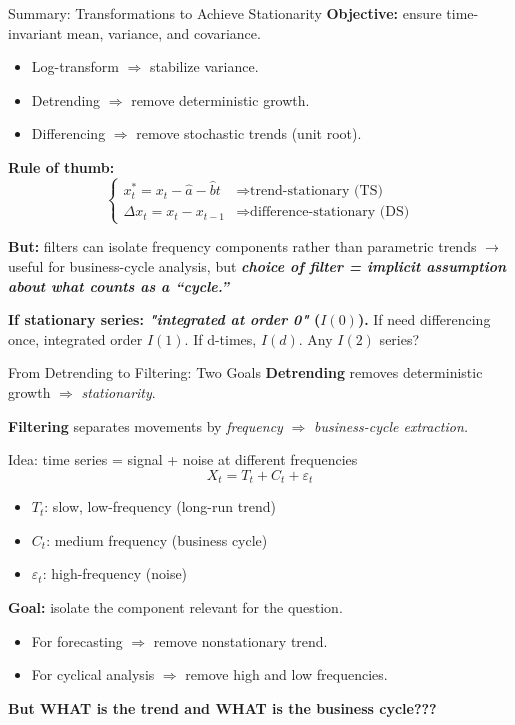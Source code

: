\documentclass{beamer}
\begin{document}
\begin{frame}{Summary: Transformations to Achieve Stationarity}
\small
\textbf{Objective:} ensure time-invariant mean, variance, and covariance.

\begin{itemize}
  \item Log-transform $\Rightarrow$ stabilize variance.
  \item Detrending $\Rightarrow$ remove deterministic growth.
  \item Differencing $\Rightarrow$ remove stochastic trends (unit root).
\end{itemize}

\pause
\textbf{Rule of thumb:}
\[
\begin{cases}
x_t^* = x_t - \hat a - \hat b t & \Rightarrow \text{trend-stationary (TS)}\\[4pt]
\Delta x_t = x_t - x_{t-1} & \Rightarrow \text{difference-stationary (DS)}
\end{cases}
\]

\textbf{But:} filters can isolate frequency components rather than parametric trends $\to$ useful for business-cycle analysis, but \textbf{\textit{choice of filter = implicit assumption about what counts as a “cycle.”}}

\medskip
\textbf{If stationary series: \textit{"integrated at order 0"} ($I(0)$).} If need differencing once, integrated order $I(1)$. If d-times, $I(d)$. Any $I(2)$ series? 
\end{frame}

\begin{frame}{From Detrending to Filtering: Two Goals}
\small
\textbf{Detrending} removes deterministic growth $\Rightarrow$ \textit{stationarity}.
\vspace{0.2cm}

\textbf{Filtering} separates movements by \textit{frequency} $\Rightarrow$ \textit{business-cycle extraction.}

\begin{block}{Idea: time series = signal + noise at different frequencies}
\[
X_t = T_t + C_t + \varepsilon_t
\]
\begin{itemize}
  \item $T_t$: slow, low-frequency (long-run trend)
  \item $C_t$: medium frequency (business cycle)
  \item $\varepsilon_t$: high-frequency (noise)
\end{itemize}
\end{block}

\textbf{Goal:} isolate the component relevant for the question.
\begin{itemize}
  \item For forecasting $\Rightarrow$ remove nonstationary trend.
  \item For cyclical analysis $\Rightarrow$ remove high and low frequencies.
\end{itemize}

\textbf{But WHAT is the trend and WHAT is the business cycle???}
\end{frame}
\end{document}
